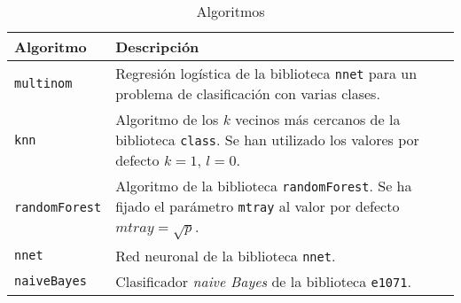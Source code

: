 \begin{table}[H]
\centering
\caption{Algoritmos}
\label{tab:algoritmos}
\begin{tabularx}{\textwidth}{lX}
\toprule
Algoritmo             & Descripción                                                                                                                             \\ \midrule
\texttt{multinom}     & Regresión logística de la biblioteca \texttt{nnet} para un problema de clasificación con varias clases.                               \\
\texttt{knn}          & Algoritmo de los $k$ vecinos más cercanos de la biblioteca \texttt{class}. 
Se han utilizado los valores por defecto $k=1$, $l=0$.      \\
\texttt{randomForest} & Algoritmo de la biblioteca \texttt{randomForest}. Se ha fijado el parámetro \texttt{mtray} al valor por defecto $mtray = \sqrt{p}$. \\
\texttt{nnet}         & Red neuronal de la biblioteca \texttt{nnet}.                                                                                          \\
\texttt{naiveBayes}   & Clasificador \textit{naive Bayes} de la biblioteca \texttt{e1071}.                                                                  \\ \bottomrule
\end{tabularx}
\end{table}

